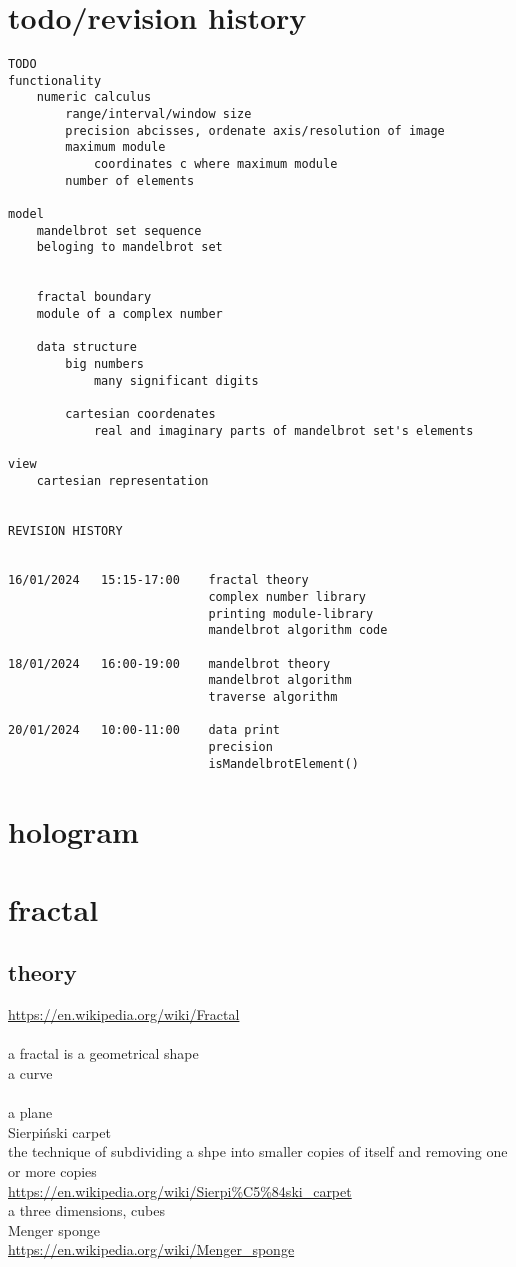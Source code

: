 \chapter{todo/revision history}
\begin{verbatim}
TODO
functionality
    numeric calculus 
        range/interval/window size
        precision abcisses, ordenate axis/resolution of image
        maximum module
            coordinates c where maximum module
        number of elements

model
    mandelbrot set sequence
    beloging to mandelbrot set  


    fractal boundary
    module of a complex number

    data structure
        big numbers
            many significant digits
        
        cartesian coordenates
            real and imaginary parts of mandelbrot set's elements

view
    cartesian representation


REVISION HISTORY


16/01/2024   15:15-17:00    fractal theory
                            complex number library
                            printing module-library
                            mandelbrot algorithm code

18/01/2024   16:00-19:00    mandelbrot theory
                            mandelbrot algorithm
                            traverse algorithm

20/01/2024   10:00-11:00    data print
                            precision
                            isMandelbrotElement()
\end{verbatim}



\chapter{hologram}
\chapter{fractal}
\section{theory}
\noindent \url{https://en.wikipedia.org/wiki/Fractal}\\
\\
a fractal is a geometrical shape\\
a curve\\
\\
a plane\\
Sierpiński carpet\\
the technique of subdividing a shpe into smaller copies of itself
and removing one or more copies\\
\url{https://en.wikipedia.org/wiki/Sierpi%C5%84ski_carpet}
\\
a three dimensions, cubes\\
Menger sponge\\
\url{https://en.wikipedia.org/wiki/Menger_sponge}\\

